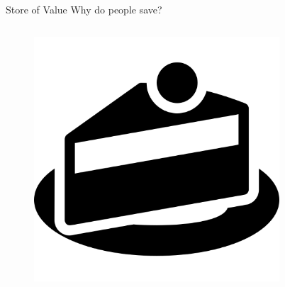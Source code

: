 \documentclass[]{beamer}
\begin{document}
\begin{frame}{Store of Value}
	Why do people save?
	\begin{columns}[T]
		\begin{column}{0.5\textwidth}
			\begin{figure}
				\includegraphics[height = 0.1\textheight]{../assets/images/cake}
			\end{figure}
		\end{column}
		\begin{column}{0.5\textwidth}
			\begin{figure}

\end{figure}
\end{column}
\end{columns}
\end{frame}
\end{document}
